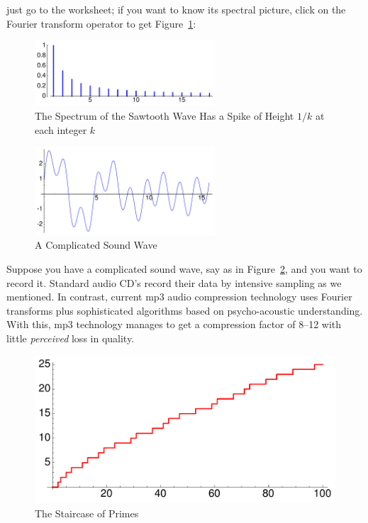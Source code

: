 \documentclass[11pt,draft]{article}
\theoremstyle{plain}
\theoremstyle{definition}
\numberwithin{equation}{section}
\numberwithin{figure}{section}
\numberwithin{table}{section}
\begin{document}
\noindent just go to the worksheet; if you want to know its spectral picture, click on the Fourier transform operator to get Figure~\ref{fig:sawtooth-spectrum}:
    
 \bigskip


\begin{figure}[H]
\begin{center}
\includegraphics[width=0.6\textwidth]{illustrations/sawtooth-spectrum}
\end{center}
\caption{The Spectrum of the Sawtooth Wave Has a Spike of Height $1/k$ at 
each integer $k$\label{fig:sawtooth-spectrum}}
\end{figure}
  

       
\begin{figure}[H]
\begin{center}
\includegraphics[width=0.6\textwidth]{illustrations/complicated-wave}
\end{center}
\caption{A Complicated Sound Wave\label{fig:complicated-wave}}
\end{figure}
Suppose you have a complicated sound wave, say as in
Figure~\ref{fig:complicated-wave}, and you want to record it.
Standard audio CD's record their data by intensive sampling as we
mentioned. In contrast, current mp3 audio compression technology uses
Fourier transforms plus sophisticated algorithms based on
psycho-acoustic understanding. With this, mp3 technology manages to
get a compression factor of 8--12 with little {\em perceived} loss in
quality.
 
\begin{figure}[H]
\begin{center}
\includegraphics[width=.35\textwidth]{illustrations/PN_100}
\caption{The Staircase of Primes\label{fig:staircase100}}
\end{center}
\end{figure}
\end{document}
